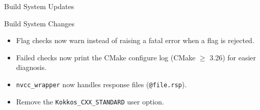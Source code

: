 
\begin{frame}[fragile]

  {\Huge Build System Updates}

  \vspace{10pt}

\end{frame}


\begin{frame}[fragile]{Build System Changes}
  \begin{itemize}
    \item Flag checks now warn instead of raising a fatal error when a flag is rejected.
    \item Failed checks now print the CMake configure log (CMake $\geq$ 3.26) for easier diagnosis.
    \item \texttt{nvcc\_wrapper} now handles response files (\texttt{@file.rsp}).
    \item Remove the \texttt{Kokkos\_CXX\_STANDARD} user option.
  \end{itemize}
\end{frame}





%



